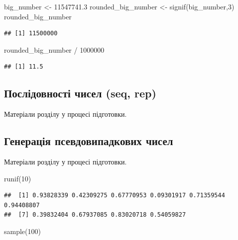 \documentclass[
]{book}
\newenvironment{Shaded}{\begin{snugshade}}{\end{snugshade}}
\newcommand{\DecValTok}[1]{\textcolor[rgb]{0.00,0.00,0.81}{#1}}
\newcommand{\FloatTok}[1]{\textcolor[rgb]{0.00,0.00,0.81}{#1}}
\newcommand{\FunctionTok}[1]{\textcolor[rgb]{0.00,0.00,0.00}{#1}}
\newcommand{\NormalTok}[1]{#1}
\newcommand{\OtherTok}[1]{\textcolor[rgb]{0.56,0.35,0.01}{#1}}
\newcommand{\SpecialCharTok}[1]{\textcolor[rgb]{0.00,0.00,0.00}{#1}}
\begin{document}
\begin{Shaded}
\begin{Highlighting}[]
\NormalTok{big\_number }\OtherTok{\textless{}{-}} \FloatTok{11547741.3}
\NormalTok{rounded\_big\_number }\OtherTok{\textless{}{-}} \FunctionTok{signif}\NormalTok{(big\_number,}\DecValTok{3}\NormalTok{)}
\NormalTok{rounded\_big\_number}
\end{Highlighting}
\end{Shaded}

\begin{verbatim}
## [1] 11500000
\end{verbatim}

\begin{Shaded}
\begin{Highlighting}[]
\NormalTok{rounded\_big\_number }\SpecialCharTok{/} \DecValTok{1000000}
\end{Highlighting}
\end{Shaded}

\begin{verbatim}
## [1] 11.5
\end{verbatim}

\hypertarget{chapter242}{%
\subsection{Послідовності чисел (seq, rep)}\label{chapter242}}

Матеріали розділу у процесі підготовки.

\hypertarget{chapter243}{%
\subsection{Генерація псевдовипадкових чисел}\label{chapter243}}

Матеріали розділу у процесі підготовки.

\begin{Shaded}
\begin{Highlighting}[]
\FunctionTok{runif}\NormalTok{(}\DecValTok{10}\NormalTok{)}
\end{Highlighting}
\end{Shaded}

\begin{verbatim}
##  [1] 0.93828339 0.42309275 0.67770953 0.09301917 0.71359544 0.94408807
##  [7] 0.39832404 0.67937085 0.83020718 0.54059827
\end{verbatim}

\begin{Shaded}
\begin{Highlighting}[]
\FunctionTok{sample}\NormalTok{(}\DecValTok{100}\NormalTok{)}
\end{Highlighting}
\end{Shaded}
\end{document}
